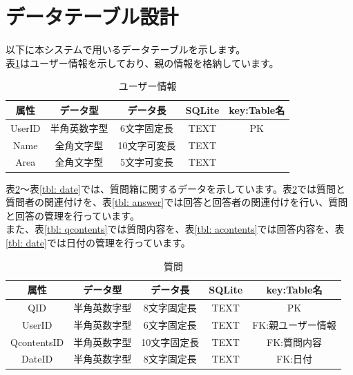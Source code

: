 \documentclass[a4j]{jarticle}
\begin{document}
\newpage
\section{データテーブル設計}

以下に本システムで用いるデータテーブルを示します。\\
表\ref{tbl: user}はユーザー情報を示しており、親の情報を格納しています。\\

\begin{table}[H]
    \caption{ユーザー情報}
    \label{tbl: user}
    \begin{center}
        \begin{tabular}{|c|c|c|c|c|} \hline
            属性 & データ型 & データ長 & SQLite & key:Table名\\ \hline \hline
            UserID & 半角英数字型 & 6文字固定長 & TEXT & PK\\ \hline
            Name & 全角文字型 & 10文字可変長 & TEXT & \\ \hline
            Area & 全角文字型 & 5文字可変長 & TEXT & \\ \hline
        \end{tabular}
    \end{center}
\end{table}


表\ref{tbl: question}～表\ref{tbl: date}では、質問箱に関するデータを示しています。表\ref{tbl: question}では質問と質問者の関連付けを、表\ref{tbl: answer}では回答と回答者の関連付けを行い、質問と回答の管理を行っています。\\
また、表\ref{tbl: qcontents}では質問内容を、表\ref{tbl: acontents}では回答内容を、表\ref{tbl: date}では日付の管理を行っています。\\
\begin{table}[H]
    \caption{質問}
    \label{tbl: question}
    \begin{center}
        \begin{tabular}{|c|c|c|c|c|} \hline
            属性 & データ型 & データ長 & SQLite & key:Table名\\ \hline \hline
            QID & 半角英数字型 & 8文字固定長 & TEXT & PK\\ \hline
            UserID & 半角英数字型 & 6文字固定長 & TEXT & FK:親ユーザー情報\\ \hline
            QcontentsID & 半角英数字型 & 10文字固定長 & TEXT & FK:質問内容\\ \hline
            DateID & 半角英数字型 & 8文字固定長 & TEXT & FK:日付\\ \hline
        \end{tabular}
    \end{center}
\end{table}
\end{document}
